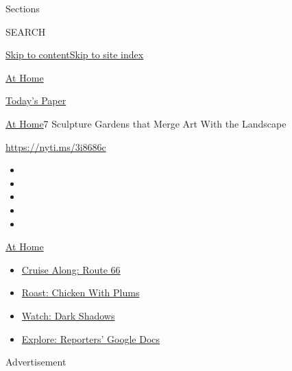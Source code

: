 Sections

SEARCH

\protect\hyperlink{site-content}{Skip to
content}\protect\hyperlink{site-index}{Skip to site index}

\href{https://www.nytimes3xbfgragh.onion/spotlight/at-home}{At Home}

\href{https://myaccount.nytimes3xbfgragh.onion/auth/login?response_type=cookie\&client_id=vi}{}

\href{https://www.nytimes3xbfgragh.onion/section/todayspaper}{Today's
Paper}

\href{/spotlight/at-home}{At Home}\textbar{}7 Sculpture Gardens that
Merge Art With the Landscape

\url{https://nyti.ms/3i8686c}

\begin{itemize}
\item
\item
\item
\item
\item
\end{itemize}

\href{https://www.nytimes3xbfgragh.onion/spotlight/at-home?action=click\&pgtype=Article\&state=default\&region=TOP_BANNER\&context=at_home_menu}{At
Home}

\begin{itemize}
\tightlist
\item
  \href{https://www.nytimes3xbfgragh.onion/2020/09/07/travel/route-66.html?action=click\&pgtype=Article\&state=default\&region=TOP_BANNER\&context=at_home_menu}{Cruise
  Along: Route 66}
\item
  \href{https://www.nytimes3xbfgragh.onion/2020/09/04/dining/sheet-pan-chicken.html?action=click\&pgtype=Article\&state=default\&region=TOP_BANNER\&context=at_home_menu}{Roast:
  Chicken With Plums}
\item
  \href{https://www.nytimes3xbfgragh.onion/2020/09/04/arts/television/dark-shadows-stream.html?action=click\&pgtype=Article\&state=default\&region=TOP_BANNER\&context=at_home_menu}{Watch:
  Dark Shadows}
\item
  \href{https://www.nytimes3xbfgragh.onion/interactive/2020/at-home/even-more-reporters-editors-diaries-lists-recommendations.html?action=click\&pgtype=Article\&state=default\&region=TOP_BANNER\&context=at_home_menu}{Explore:
  Reporters' Google Docs}
\end{itemize}

Advertisement

